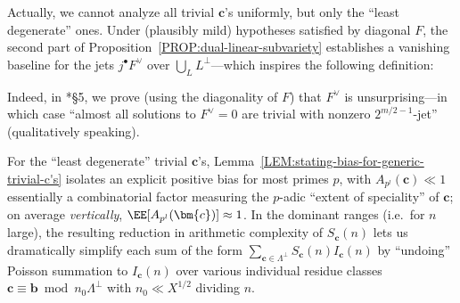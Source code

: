 \documentclass[12pt]{report}
\begin{document}
Actually,
we cannot analyze all trivial $\bm{c}$'s uniformly,
but only the ``least degenerate'' ones.
Under (plausibly mild) hypotheses satisfied by diagonal $F$,
the second part of Proposition~\ref{PROP:dual-linear-subvariety}
establishes a vanishing baseline for the jets $j^\bullet{F^\vee}$ over $\bigcup_{L}L^\perp$---which inspires the following definition:

Indeed,
in \cite{wang2021_isolating_special_solutions}*{\S5},
we prove (using the diagonality of $F$) that $F^\vee$ is unsurprising---in which case
``almost all solutions to $F^\vee=0$ are trivial with nonzero $2^{m/2-1}$-jet''
(qualitatively speaking).


For the ``least degenerate'' trivial $\bm{c}$'s,
Lemma~\ref{LEM:stating-bias-for-generic-trivial-c's} isolates an explicit positive bias
for most primes $p$,
with $A_{p^l}(\bm{c})\ll 1$ essentially a combinatorial factor measuring the $p$-adic ``extent of speciality'' of $\bm{c}$;
on average \emph{vertically}, $\EE[A_{p^l}(\bm{c})]\approx 1$.
In the dominant ranges
(i.e.~for $n$ large),
the resulting reduction in arithmetic complexity of $S_{\bm{c}}(n)$ lets us
dramatically simplify each sum of the form $\sum_{\bm{c}\in\Lambda^\perp}S_{\bm{c}}(n)I_{\bm{c}}(n)$
by ``undoing'' Poisson summation to $I_{\bm{c}}(n)$ over various individual residue classes $\bm{c}\equiv\bm{b}\bmod{n_0\Lambda^\perp}$ with $n_0\ll X^{1/2}$ dividing $n$.
\end{document}
